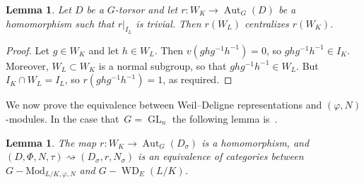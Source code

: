 \documentclass{amsart}
\newtheorem{lemma}[subsubsection]{Lemma}
\theoremstyle{definition}
\theoremstyle{remark}
\DeclareMathOperator{\Aut}{Aut}
\DeclareMathOperator{\Gal}{Gal}
\DeclareMathOperator{\GL}{GL}
\DeclareMathOperator{\WD}{WD}
\begin{document}
\begin{lemma}\label{lemma:wl-centralizes-wk}
Let $D$ be a $G$-torsor and let $r:W_K\rightarrow \Aut_G(D)$ be a homomorphism such that $r|_{I_L}$ is trivial.  Then $r(W_L)$ centralizes $r(W_K)$.
\end{lemma}
\begin{proof}
Let $g\in W_K$ and let $h\in W_L$.  Then $v(ghg^{-1}h^{-1})=0$, so $ghg^{-1}h^{-1}\in I_K$.  Moreover, %
$W_L\subset W_K$ is a normal subgroup, so that
$ghg^{-1}h^{-1}\in W_L$. %
But $I_K\cap W_L=I_L$, so $r (ghg^{-1}h^{-1})=1$, as required.
\end{proof}
We now prove the equivalence between Weil--Deligne representations and
$(\varphi,N)$-modules. In the case that~$G=\GL_n$ the following lemma is~\cite[Prop.\ 4.1]{MR2359853}.
\begin{lemma}\label{lem: WD stack agrees with phi N stack}
The map $r:W_K\rightarrow\Aut_G(D_\sigma)$ is a homomorphism, and
$(D,\Phi,N,\tau)\rightsquigarrow (D_\sigma,r,N_\sigma)$
is an equivalence of categories between $G-\mathrm{Mod}_{L/K,\varphi,N}$ and $G-\WD_E(L/K)$.
\end{lemma}
\end{document}
